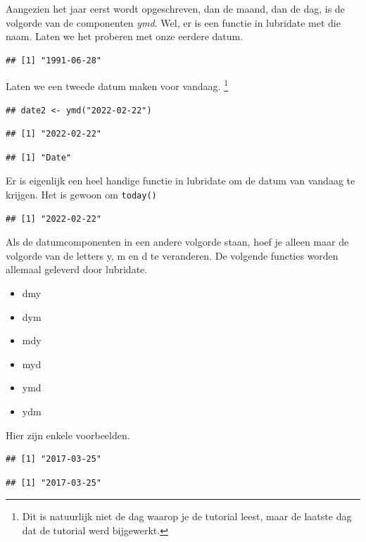 \documentclass[]{tufte-book}
\providecommand{\tightlist}{%
  \setlength{\itemsep}{0pt}\setlength{\parskip}{0pt}}
\begin{document}
Aangezien het jaar eerst wordt opgeschreven, dan de maand, dan de dag, is de volgorde van de componenten \emph{ymd}. Wel, er is een functie in lubridate met die naam. Laten we het proberen met onze eerdere datum.

\begin{verbatim}
## [1] "1991-06-28"
\end{verbatim}

Laten we een tweede datum maken voor vandaag. \footnote{Dit is natuurlijk niet de dag waarop je de tutorial leest, maar de laatste dag dat de tutorial werd bijgewerkt.}

\begin{verbatim}
## date2 <- ymd("2022-02-22")
\end{verbatim}

\begin{verbatim}
## [1] "2022-02-22"
\end{verbatim}

\begin{verbatim}
## [1] "Date"
\end{verbatim}

Er is eigenlijk een heel handige functie in lubridate om de datum van vandaag te krijgen. Het is gewoon om \texttt{today()}

\begin{verbatim}
## [1] "2022-02-22"
\end{verbatim}

Als de datumcomponenten in een andere volgorde staan, hoef je alleen maar de volgorde van de letters y, m en d te veranderen. De volgende functies worden allemaal geleverd door lubridate.

\begin{itemize}
\tightlist
\item
  dmy
\item
  dym
\item
  mdy
\item
  myd
\item
  ymd
\item
  ydm
\end{itemize}

Hier zijn enkele voorbeelden.

\begin{verbatim}
## [1] "2017-03-25"
\end{verbatim}

\begin{verbatim}
## [1] "2017-03-25"
\end{verbatim}
\end{document}
